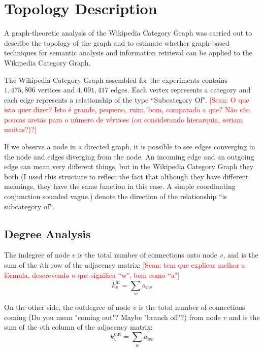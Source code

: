 
\section{\hspace*{3pt}  Topology Description}

A graph-theoretic analysis of the Wikipedia Category Graph was carried out to describe the topology of the graph and to estimate whether graph-based techniques for semantic analysis and information retrieval can be applied to the Wikipedia Category Graph.

The Wikipedia Category Graph assembled for the experiments contains $1,475,806$ vertices and $4,091,417$ edges. Each vertex represents a category and each edge represents a relationship of the type ``Subcategory Of". \textcolor{red}{[Sean: O que isto quer dizer? Isto é grande, pequeno, ruim, bom, comparado a que? Não são poucas aretas para o número de vértices (ou considerando hierarquia, seriam muitas?)?]}

If we observe a node in a directed graph, it is possible to see edges converging in the node and edges diverging from the node. An incoming edge and an outgoing edge can mean very different things, but in the Wikipedia Category Graph they both (I used this structure to reflect the fact that although they have different meanings, they have the same function in this case. A simple coordinating conjunction sounded vague.) denote the direction of the relationship ``is subcategory of". 

\subsection{\hspace*{3pt} Degree Analysis}

The indegree of node $v$ is the total number of connections onto node $v$, and is the sum of the $i$th row of the adjacency matrix: \textcolor{red}{[Sean: tem que explicar melhor a fórmula, descrevendo o que significa ``w", bem como ``a"]}
\begin{equation}
 k_v^{\text{in}}=\sum_w a_{vw}
\end{equation}

On the other side, the outdegree of node $v$ is the total number of connections coming (Do you mean "coming out"? Maybe "branch off"?) from node $v$ and is the sum of the $v$th column of the adjacency matrix:
\begin{equation}
k_v^{\text{out}}=\sum_w a_{wv}
\end{equation}

